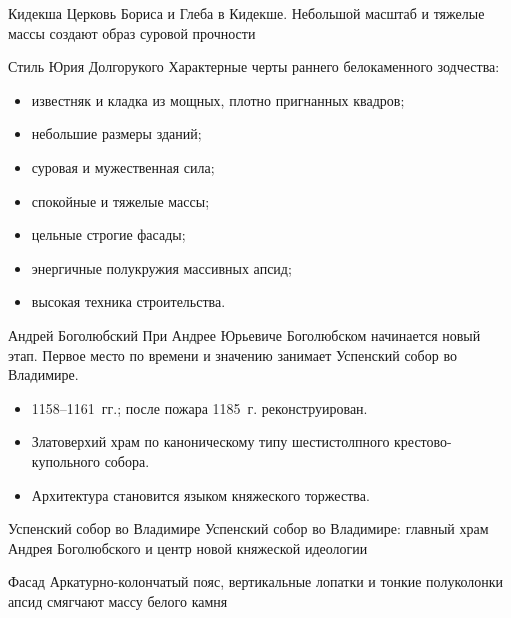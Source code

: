 \begin{frame}{Кидекша}
    {Церковь Бориса и Глеба в Кидекше.
     Небольшой масштаб и тяжелые массы создают образ
     суровой прочности}
\end{frame}

\begin{frame}{Стиль Юрия Долгорукого}
  Характерные черты раннего белокаменного зодчества:
  \begin{itemize}
    \item известняк и кладка из мощных, плотно пригнанных квадров;
    \item небольшие размеры зданий;
    \item суровая и мужественная сила;
    \item спокойные и тяжелые массы;
    \item цельные строгие фасады;
    \item энергичные полукружия массивных апсид;
    \item высокая техника строительства.
  \end{itemize}
\end{frame}

\begin{frame}{Андрей Боголюбский}
  При Андрее Юрьевиче Боголюбском начинается новый этап.
  Первое место по времени и значению занимает Успенский собор
  во Владимире.

  \begin{itemize}
    \item 1158--1161~гг.; после пожара 1185~г. реконструирован.
    \item Златоверхий храм по каноническому типу
          шестистолпного крестово-купольного собора.
    \item Архитектура становится языком княжеского торжества.
  \end{itemize}
\end{frame}

\begin{frame}{Успенский собор во Владимире}
    {Успенский собор во Владимире:
     главный храм Андрея Боголюбского и центр новой княжеской идеологии}
\end{frame}

\begin{frame}{Фасад}
    {Аркатурно-колончатый пояс, вертикальные лопатки
     и тонкие полуколонки апсид смягчают массу белого камня}
\end{frame}

